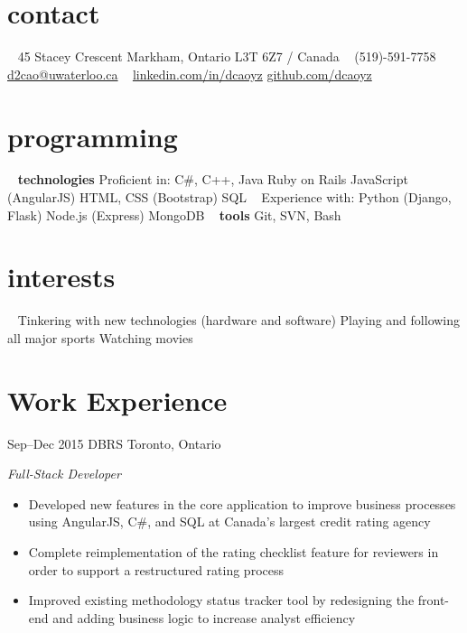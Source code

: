 \documentclass[print]{friggeri-cv} %
\begin{document}


\begin{aside}
\section{contact}
~
45 Stacey Crescent
Markham, Ontario
L3T 6Z7 / Canada
~
(519)-591-7758
\href{mailto:d2cao@uwaterloo.ca}{d2cao@uwaterloo.ca}
~
\href{https://ca.linkedin.com/in/dcaoyz}{linkedin.com/in/dcaoyz}
\href{https://github.com/dcaoyz}{github.com/dcaoyz}
~
\section{programming}
~
{\textbf{technologies}
Proficient in:
C\#, C++, Java
Ruby on Rails
JavaScript (AngularJS)
HTML, CSS (Bootstrap)
SQL}
~
Experience with:
Python (Django, Flask)
Node.js (Express)
MongoDB
~
\textbf{tools}
Git, SVN, Bash
~
\section{interests}
~
Tinkering with new technologies (hardware and software)
Playing and following all major sports
Watching movies
\end{aside}


\section{Work Experience}


\begin{entrylist}
\entry
{Sep--Dec 2015}
{DBRS}
{Toronto, Ontario}
{\emph{Full-Stack Developer}
\begin{itemize}
\item Developed new features in the core application to improve business processes using AngularJS, C\#, and SQL at Canada's largest credit rating agency
\item Complete reimplementation of the rating checklist feature for reviewers in order to support a restructured rating process
\item Improved existing methodology status tracker tool by redesigning the front-end and adding business logic to increase analyst efficiency
\end{itemize}}
\end{entrylist}
\end{document}
